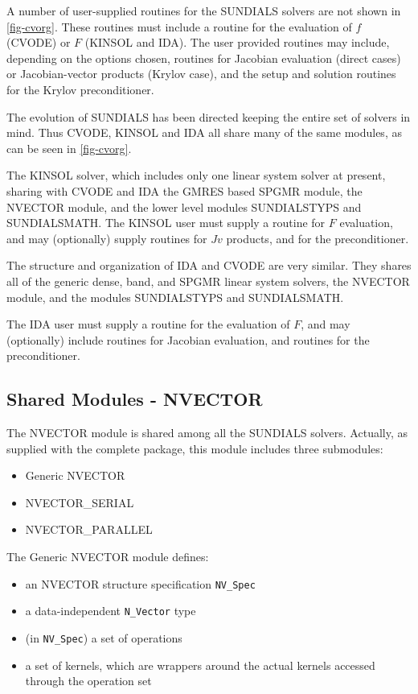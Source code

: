 A number of user-supplied routines for the SUNDIALS solvers are not shown in
\ref{fig-cvorg}.  These routines must include a routine for the evaluation
of $f$ (CVODE) or $F$ (KINSOL and IDA). The user provided routines may
include, depending on the options chosen, routines for Jacobian evaluation
(direct cases) or Jacobian-vector products (Krylov case), and the setup and
solution routines for the Krylov preconditioner.

The evolution of SUNDIALS has been directed keeping the entire set of
solvers in mind.  Thus CVODE, KINSOL and IDA all share many of the same
modules, as can be seen in \ref{fig-cvorg}.

The KINSOL solver, which includes only one linear system solver at present,
sharing with CVODE and IDA the GMRES based SPGMR module, the NVECTOR module,
and the lower level modules SUNDIALSTYPS and SUNDIALSMATH. The KINSOL user
must supply a routine for $F$ evaluation, and may (optionally) supply
routines for $Jv$ products, and for the preconditioner.

The structure and organization of IDA and CVODE are very similar. They
shares all of the generic dense, band, and SPGMR linear system solvers, the
NVECTOR module, and the modules SUNDIALSTYPS and SUNDIALSMATH.

The IDA user must supply a routine for the evaluation of $F$, and may
(optionally) include routines for Jacobian evaluation, and routines
for the preconditioner.

\subsection{Shared Modules - NVECTOR}

The NVECTOR module is shared among all the SUNDIALS solvers.
Actually, as supplied with the complete package, this module
includes three submodules:
\begin{itemize}
\item Generic NVECTOR
\item NVECTOR\_SERIAL
\item NVECTOR\_PARALLEL
\end{itemize}

The Generic NVECTOR module defines:
\begin{itemize}
\item an NVECTOR  structure specification {\tt NV\_Spec}
\item a data-independent {\tt N\_Vector} type
\item (in {\tt NV\_Spec}) a set of operations
\item a set of kernels, which are wrappers around the actual kernels
accessed through the operation set
\end{itemize}

